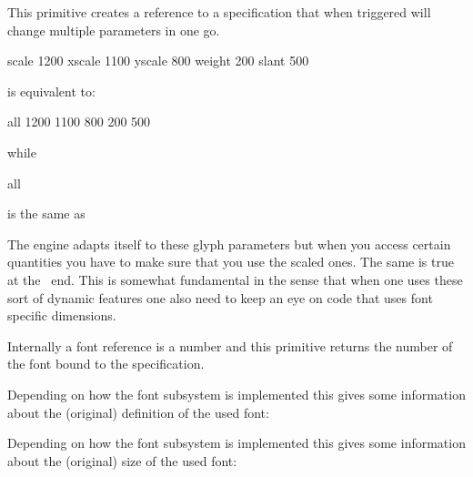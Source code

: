 \stopoldprimitive

\startnewprimitive[title={\prm {fontspecdef}}]

This primitive creates a reference to a specification that when triggered will
change multiple parameters in one go.

\starttyping
\fontspecdef\MyFontSpec
    \fontid\font
    scale  1200
    xscale 1100
    yscale  800
    weight  200
    slant   500
\relax
\stoptyping

is equivalent to:

\starttyping
\fontspecdef\MyFontSpec
    \fontid\font
    all 1200 1100 800 200 500
\relax
\stoptyping

while

\starttyping
\fontspecdef\MyFontSpec
    \fontid\font
    all \glyphscale \glyphxscale \glyphyscale \glyphslant \glyphweight
\relax
\stoptyping

is the same as

\starttyping
\fontspecdef\MyFontSpec
    \fontid\font
\relax
\stoptyping

The engine adapts itself to these glyph parameters but when you access certain
quantities you have to make sure that you use the scaled ones. The same is true
at the \LUA\ end. This is somewhat fundamental in the sense that when one uses
these sort of dynamic features one also need to keep an eye on code that uses
font specific dimensions.

\stopnewprimitive

\startnewprimitive[title={\prm {fontspecid}}]

Internally a font reference is a number and this primitive returns the number of
the font bound to the specification.

\stopnewprimitive

\startnewprimitive[title={\prm {fontspecifiedname}}]

Depending on how the font subsystem is implemented this gives some information
about the (original) definition of the used font:

\startbuffer
{\tf \fontspecifiedname\font}
{\bf \fontspecifiedname\font}
{\sl \fontspecifiedname\font}
\stopbuffer

\typebuffer

\startlines
\getbuffer
\stoplines

\stopnewprimitive

\startnewprimitive[title={\prm {fontspecifiedsize}}]

Depending on how the font subsystem is implemented this gives some information
about the (original) size of the used font:

